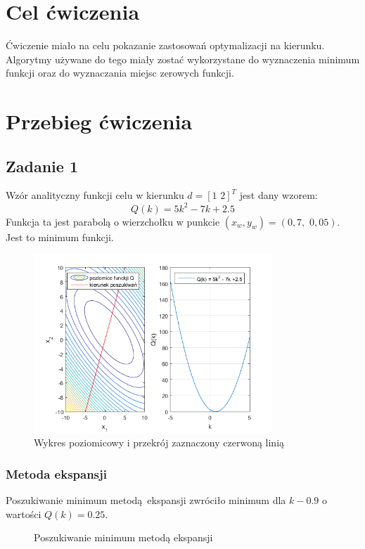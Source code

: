 \documentclass[a4paper, 12pt]{article}
\begin{document}
	\noindent
	\lstset{language=Matlab, basicstyle=\footnotesize,
		keepspaces=true,frame=single,tabsize=4}
	\section{Cel ćwiczenia}
		Ćwiczenie miało na celu pokazanie zastosowań optymalizacji na kierunku. Algorytmy używane do tego miały zostać wykorzystane do wyznaczenia minimum funkcji oraz do wyznaczania miejsc zerowych funkcji.
	\section{Przebieg ćwiczenia}
		\subsection{Zadanie 1}
			Wzór analityczny funkcji celu w kierunku $d = [1\,\, 2]^T$ jest dany wzorem:
			$$
				Q(k) = 5 k^2 - 7k + 2.5
			$$
			Funkcja ta jest parabolą o wierzchołku w punkcie $(x_w, y_w) = (0,7, \,\,0,05)$. Jest to minimum funkcji.
			\begin{figure}[H]
				\centering 
				\includegraphics[width=0.8\textwidth]{old/poziomicowy.png}
				\caption{Wykres poziomicowy i przekrój zaznaczony czerwoną linią}
			\end{figure}
			\newpage \noindent
			\subsubsection{Metoda ekspansji}
				Poszukiwanie minimum metodą ekspansji zwróciło minimum dla $k - 0.9$ \newline o wartości $Q(k) = 0.25$.
				\begin{figure}[H]
					\centering
					\def \svgwidth{0.7\columnwidth}
					
					\caption{Poszukiwanie minimum metodą ekspansji}
				\end{figure}\noindent
\end{document}
